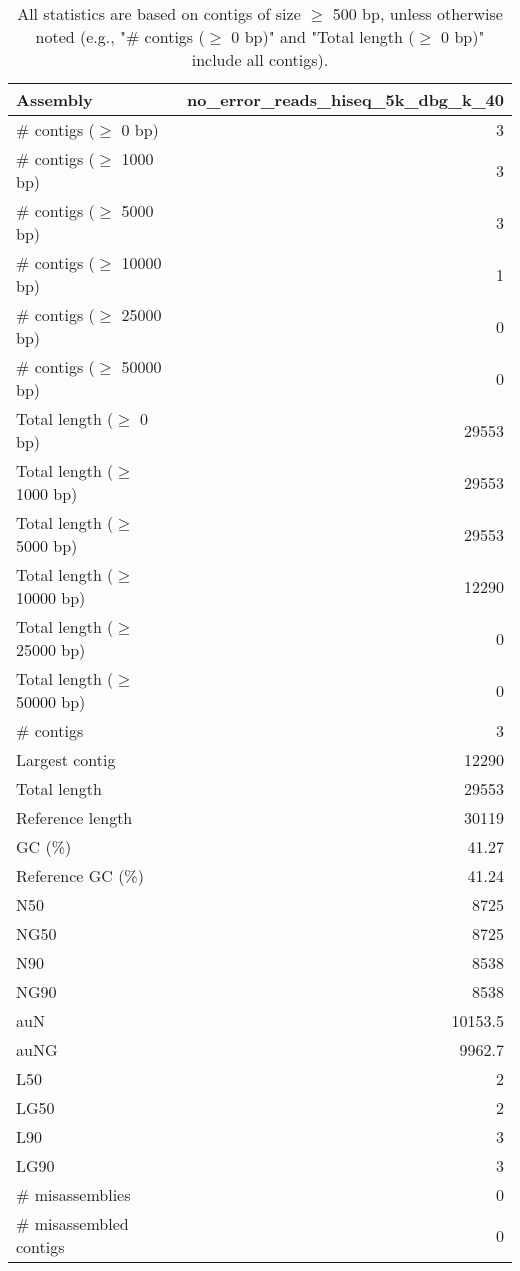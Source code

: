\documentclass[12pt,a4paper]{article}
\begin{document}
\begin{table}[ht]
\begin{center}
\caption{All statistics are based on contigs of size $\geq$ 500 bp, unless otherwise noted (e.g., "\# contigs ($\geq$ 0 bp)" and "Total length ($\geq$ 0 bp)" include all contigs).}
\begin{tabular}{|l*{1}{|r}|}
\hline
Assembly & no\_error\_reads\_hiseq\_5k\_dbg\_k\_40 \\ \hline
\# contigs ($\geq$ 0 bp) & 3 \\ \hline
\# contigs ($\geq$ 1000 bp) & 3 \\ \hline
\# contigs ($\geq$ 5000 bp) & 3 \\ \hline
\# contigs ($\geq$ 10000 bp) & 1 \\ \hline
\# contigs ($\geq$ 25000 bp) & 0 \\ \hline
\# contigs ($\geq$ 50000 bp) & 0 \\ \hline
Total length ($\geq$ 0 bp) & 29553 \\ \hline
Total length ($\geq$ 1000 bp) & 29553 \\ \hline
Total length ($\geq$ 5000 bp) & 29553 \\ \hline
Total length ($\geq$ 10000 bp) & 12290 \\ \hline
Total length ($\geq$ 25000 bp) & 0 \\ \hline
Total length ($\geq$ 50000 bp) & 0 \\ \hline
\# contigs & 3 \\ \hline
Largest contig & 12290 \\ \hline
Total length & 29553 \\ \hline
Reference length & 30119 \\ \hline
GC (\%) & 41.27 \\ \hline
Reference GC (\%) & 41.24 \\ \hline
N50 & 8725 \\ \hline
NG50 & 8725 \\ \hline
N90 & 8538 \\ \hline
NG90 & 8538 \\ \hline
auN & 10153.5 \\ \hline
auNG & 9962.7 \\ \hline
L50 & 2 \\ \hline
LG50 & 2 \\ \hline
L90 & 3 \\ \hline
LG90 & 3 \\ \hline
\# misassemblies & 0 \\ \hline
\# misassembled contigs & 0 \\ \hline

\end{tabular}
\end{center}
\end{table}
\end{document}
